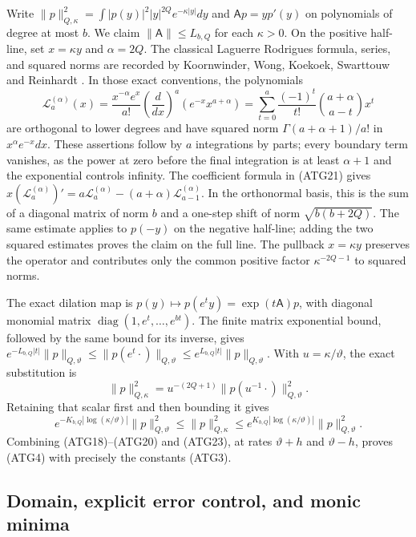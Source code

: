 \documentclass[11pt,a4paper]{article}
\begin{document}
Write $\|p\|_{Q,\kappa}^2=\int|p(y)|^2|y|^{2Q}
e^{-\kappa|y|}dy$ and $\mathsf A p=yp'(y)$ on polynomials of
degree at most $b$. We claim
$\|\mathsf A\|\le L_{b,Q}$ for each $\kappa>0$.
On the positive half-line, set $x=\kappa y$ and $\alpha=2Q$.
The classical Laguerre Rodrigues formula, series, and squared norms
are recorded by Koornwinder, Wong, Koekoek, Swarttouw and Reinhardt
\cite[Table~18.3.1; eq.~(18.5.5), Table~18.5.1;
eq.~(18.5.12)]{human:dlmf18}. In those exact conventions, the polynomials
\[
 \mathcal L_a^{(\alpha)}(x)
 =\frac{x^{-\alpha}e^x}{a!}
          \left(\frac d{dx}\right)^a(e^{-x}x^{a+\alpha})
 =\sum_{t=0}^a\frac{(-1)^t}{t!}
                         \binom{a+\alpha}{a-t}x^t
\tag{ATG21}
\]
are orthogonal to lower degrees and have squared norm
$\Gamma(a+\alpha+1)/a!$ in $x^\alpha e^{-x}dx$.
These assertions follow by $a$ integrations by parts; every boundary
term vanishes, as the power at zero before the final integration is
at least $\alpha+1$ and the exponential controls infinity.
The coefficient formula in (ATG21) gives
$x(\mathcal L_a^{(\alpha)})'
=a\mathcal L_a^{(\alpha)}-(a+\alpha)\mathcal L_{a-1}^{(\alpha)}$.
In the orthonormal basis, this is the sum of a diagonal matrix of
norm $b$ and a one-step shift of norm $\sqrt{b(b+2Q)}$.
The same estimate applies to $p(-y)$ on the negative half-line;
adding the two squared estimates proves the claim on the full line.
The pullback $x=\kappa y$ preserves the operator and contributes
only the common positive factor $\kappa^{-2Q-1}$ to squared norms.

The exact dilation map is $p(y)\mapsto p(e^ty)=\exp(t\mathsf A)p$,
with diagonal monomial matrix $\operatorname{diag}(1,e^t,\ldots,e^{bt})$.
The finite matrix exponential bound, followed by the same bound for
its inverse, gives
$e^{-L_{b,Q}|t|}\|p\|_{Q,\vartheta}
\le\|p(e^t\cdot)\|_{Q,\vartheta}
\le e^{L_{b,Q}|t|}\|p\|_{Q,\vartheta}$.
With $u=\kappa/\vartheta$, the exact substitution is
\[
 \|p\|_{Q,\kappa}^2
 =u^{-(2Q+1)}\|p(u^{-1}\cdot)\|_{Q,\vartheta}^2.
\tag{ATG22}
\]
Retaining that scalar first and then bounding it gives
\[
 e^{-K_{b,Q}|\log(\kappa/\vartheta)|}\|p\|_{Q,\vartheta}^2
 \le\|p\|_{Q,\kappa}^2
 \le e^{K_{b,Q}|\log(\kappa/\vartheta)|}\|p\|_{Q,\vartheta}^2.
\tag{ATG23}
\]
Combining (ATG18)--(ATG20) and (ATG23), at rates
$\vartheta+h$ and $\vartheta-h$, proves (ATG4) with precisely
the constants (ATG3).

\subsection{Domain, explicit error control, and monic minima}
\end{document}
